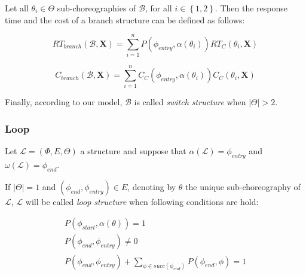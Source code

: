 \documentclass[10pt,a4paper]{report}
\theoremstyle{definition}
\begin{document}
Let all $\theta_i \in \Theta$ sub-choreographies of $\mathcal{B}$, for all $i \in \left\lbrace 1,2 \right\rbrace $. Then the response time and the cost of a branch structure can be defined as follows:

\begin{equation}
	RT_{branch}(\mathcal{B}, \textbf{X}) = \sum_{i = 1}^n P(\phi_{entry}, \alpha(\theta_i)) RT_C(\theta_i, \textbf{X})
\end{equation}

\begin{equation}
	C_{branch}(\mathcal{B}, \textbf{X}) = \sum_{i = 1}^n C_C(\phi_{entry}, \alpha(\theta_i)) C_C(\theta_i, \textbf{X})
\end{equation}

Finally, according to our model, $\mathcal{B}$ is called \textit{switch structure} when $|\Theta| > 2$.

\subsubsection{Loop}

Let $\mathcal{L} = (\Phi,E,\Theta)$ a structure and suppose that $\alpha(\mathcal{L}) = \phi_{entry}$ and $\omega(\mathcal{L}) = \phi_{end}$. 

If $|\Theta| = 1$ and $(\phi_{end}, \phi_{entry}) \in E$, denoting by $\theta$ the unique sub-choreography of $\mathcal{L}$, $\mathcal{L}$ will be called \textit{loop structure} when following conditions are hold:

\begin{eqnarray}
	P(\phi_{start}, \alpha(\theta)) = 1 \\
	P(\phi_{end}, \phi_{entry}) \neq 0 \\
	P(\phi_{end}, \phi_{entry}) + \sum_{\phi \in succ(\phi_{end})} P(\phi_{end}, \phi) = 1
\end{eqnarray}
\end{document}
